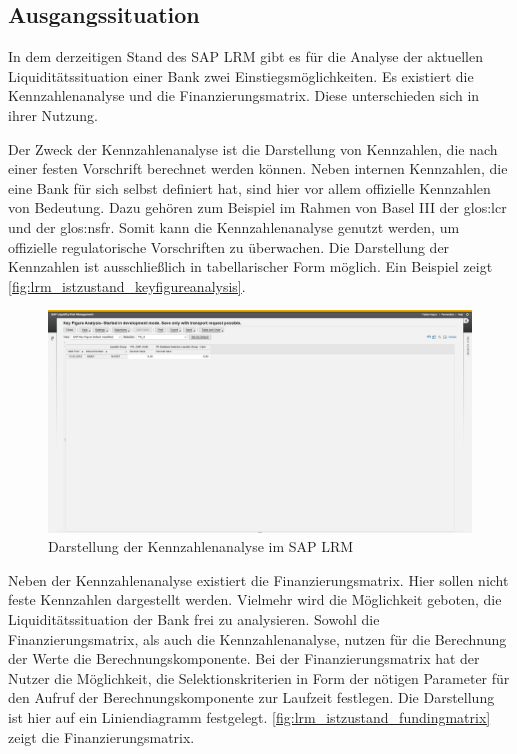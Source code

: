 \begin{onehalfspacing}
\section{Ausgangssituation}
In dem derzeitigen Stand des SAP LRM gibt es für die Analyse der aktuellen Liquiditätssituation einer Bank zwei Einstiegsmöglichkeiten. Es existiert die Kennzahlenanalyse und die Finanzierungsmatrix. Diese unterschieden sich in ihrer Nutzung.

Der Zweck der Kennzahlenanalyse ist die Darstellung von Kennzahlen, die nach einer festen Vorschrift berechnet werden können. Neben internen Kennzahlen, die eine Bank für sich selbst definiert hat, sind hier vor allem offizielle Kennzahlen von Bedeutung. Dazu gehören zum Beispiel im Rahmen von Basel III der \gls{glos:lcr} und der \gls{glos:nsfr}. Somit kann die Kennzahlenanalyse genutzt werden, um offizielle regulatorische Vorschriften zu überwachen. Die Darstellung der Kennzahlen ist ausschließlich in tabellarischer Form möglich. Ein Beispiel zeigt \vref{fig:lrm_istzustand_keyfigureanalysis}.

\begin{figure}[!ht]
\centering
\setlength{\unitlength}{1mm}
\includegraphics[width=15cm]{images/KeyFigureAnalysis_Example.png}
\caption{Darstellung der Kennzahlenanalyse im SAP LRM\label{fig:lrm_istzustand_keyfigureanalysis}}
\end{figure}

Neben der Kennzahlenanalyse existiert die Finanzierungsmatrix. Hier sollen nicht feste Kennzahlen dargestellt werden. Vielmehr wird  die Möglichkeit geboten, die Liquiditätssituation der Bank frei zu analysieren. Sowohl die Finanzierungsmatrix, als auch die Kennzahlenanalyse, nutzen für die Berechnung der Werte die Berechnungskomponente. Bei der Finanzierungsmatrix hat der Nutzer die Möglichkeit, die Selektionskriterien in Form der nötigen Parameter für den Aufruf der Berechnungskomponente zur Laufzeit festlegen. Die Darstellung ist hier auf ein Liniendiagramm festgelegt. \vref{fig:lrm_istzustand_fundingmatrix} zeigt die Finanzierungsmatrix.


\end{onehalfspacing}
